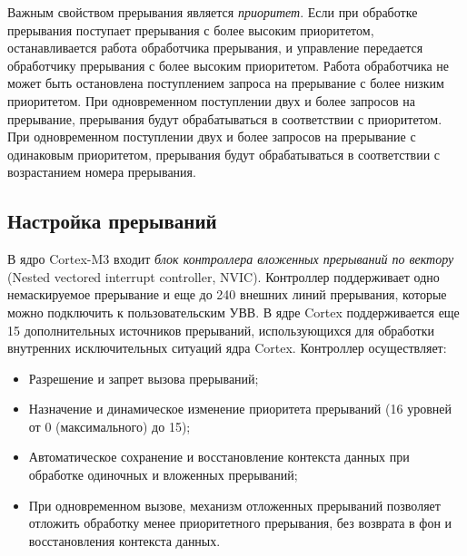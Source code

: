 Важным свойством прерывания является \textit{приоритет}. Если при обработке прерывания поступает прерывания с более высоким приоритетом, останавливается работа обработчика прерывания, и управление передается обработчику прерывания с более высоким приоритетом. Работа обработчика не может быть остановлена поступлением запроса на прерывание с более низким приоритетом. При одновременном поступлении двух и более запросов на прерывание, прерывания будут обрабатываться в соответствии с приоритетом. При одновременном поступлении двух и более запросов на прерывание с одинаковым приоритетом, прерывания будут обрабатываться в соответствии с возрастанием номера прерывания.
\subsection{Настройка прерываний}

В ядро Cortex-M3 входит \textit{блок контроллера вложенных прерываний по вектору} (Nested vectored interrupt controller, NVIC). Контроллер поддерживает одно немаскируемое прерывание и еще до 240 внешних линий прерывания, которые можно подключить к пользовательским УВВ. В ядре Cortex поддерживается еще 15 дополнительных источников прерываний, использующихся для обработки внутренних исключительных ситуаций ядра Cortex. Контроллер осуществляет:
\begin{itemize}
\item Разрешение и запрет вызова прерываний;
\item Назначение и динамическое изменение приоритета прерываний (16 уровней от 0 (максимального) до 15);
\item Автоматическое сохранение и восстановление контекста данных при обработке одиночных и вложенных прерываний;
\item При одновременном вызове, механизм отложенных прерываний позволяет отложить обработку менее приоритетного прерывания, без возврата в фон и восстановления контекста данных.
\end{itemize}


